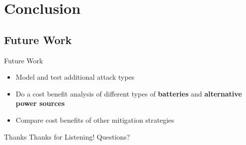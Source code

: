 \documentclass{beamer}
\begin{document}
\section{Conclusion}

\subsection{Future Work}
\begin{frame}{Future Work}
\begin{itemize}

	\item Model and test additional attack types 
	\item Do a cost benefit analysis of different types of \textbf{batteries} and \textbf{alternative power sources}
	\item Compare cost benefits of other mitigation strategies 

\end{itemize}
\end{frame}	

\begin{frame}{Thanks}
	\centering
	\huge{Thanks for Listening! Questions?}
\end{frame}
\end{document}
